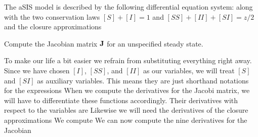The aSIS model is described by the following differential equation system:
along with the two conservation laws $[S]+[I]=1$ and $[SS]+[II]+[SI]=z/2$ and the closure approximations 

\subquestion 
Compute the Jacobian matrix $\bf J$ for an unspecified steady state.

\solution
To make our life a bit easier we refrain from substituting everything right away. Since we have chosen $[I]$, $[SS]$, and $[II]$ as our variables, we will treat $[S]$ and $[SI]$ as auxiliary variables. This means they are just shorthand notations for the expressions 
When we compute the derivatives for the Jacobi matrix, we will have to differentiate these functions accordingly. Their derivatives with respect to the variables are 
Likewise we will need the derivatives of the closure approximations
We compute 
\eq{ 
\frac{\partial}{\partial [SS]} [ISI] = -\frac{[SI]}{[S]}
}
\eq{ 
\frac{\partial}{\partial [II]} [ISI] = -\frac{[SI]}{[S]}
}
We can now compute the nine derivatives for the Jacobian 

